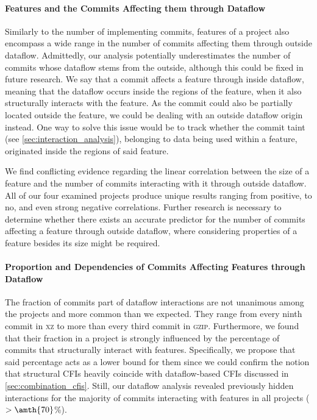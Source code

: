 \paragraph{Features and the Commits Affecting them through Dataflow}
Similarly to the number of implementing commits, features of a project also encompass a wide range in the number of commits affecting them through outside dataflow.
Admittedly, our analysis potentially underestimates the number of commits whose dataflow stems from the outside, although this could be fixed in future research.
We say that a commit affects a feature through inside dataflow, meaning that the dataflow occurs inside the regions of the feature, when it also structurally interacts with the feature.
As the commit could also be partially located outside the feature, we could be dealing with an outside dataflow origin instead.
One way to solve this issue would be to track whether the commit taint (see \autoref{sec:interaction_analysis}), belonging to data being used within a feature, originated inside the regions of said feature. 

We find conflicting evidence regarding the linear correlation between the size of a feature and the number of commits interacting with it through outside dataflow.
All of our four examined projects produce unique results ranging from positive, to no, and even strong negative correlations.
Further research is necessary to determine whether there exists an accurate predictor for the number of commits affecting a feature through outside dataflow, where considering properties of a feature besides its size might be required.

\paragraph{Proportion and Dependencies of Commits Affecting Features through Dataflow}
The fraction of commits part of dataflow interactions are not unanimous among the projects and more common than we expected.
They range from every ninth commit in \textsc{xz} to more than every third commit in \textsc{gzip}.
Furthermore, we found that their fraction in a project is strongly influenced by the percentage of commits that structurally interact with features.
Specifically, we propose that said percentage acts as a lower bound for them since we could confirm the notion that structural CFIs heavily coincide with dataflow-based CFIs discussed in \autoref{sec:combination_cfis}.
Still, our dataflow analysis revealed previously hidden interactions for the majority of commits interacting with features in all projects ($>\amth{70}$\%).

